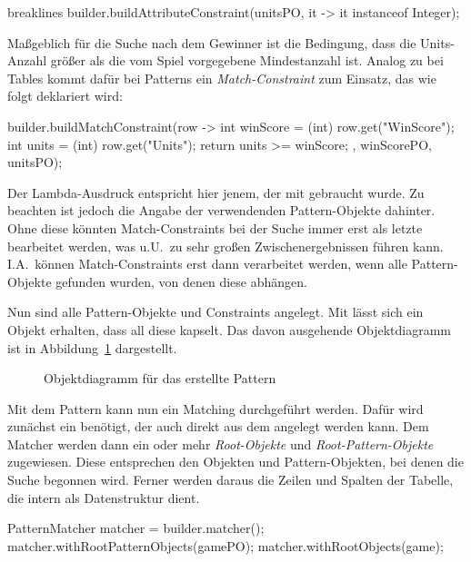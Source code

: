 \begin{jcodeblock*}{breaklines}
    builder.buildAttributeConstraint(unitsPO, it -> it instanceof Integer);
\end{jcodeblock*}

Maßgeblich für die Suche nach dem Gewinner ist die Bedingung, dass die Units-Anzahl größer als die vom Spiel vorgegebene Mindestanzahl ist.
Analog zu  bei Tables kommt dafür bei Patterns ein \emph{Match-Constraint} zum Einsatz,
das wie folgt deklariert wird:

\begin{jcodeblock}
    builder.buildMatchConstraint(row -> {
        int winScore = (int) row.get("WinScore");
        int units = (int) row.get("Units");
        return units >= winScore;
    }, winScorePO, unitsPO);
\end{jcodeblock}

Der Lambda-Ausdruck entspricht hier jenem, der mit  gebraucht wurde.
Zu beachten ist jedoch die Angabe der verwendenden Pattern-Objekte dahinter.
Ohne diese könnten Match-Constraints bei der Suche immer erst als letzte bearbeitet werden,
was u.U.\ zu sehr großen Zwischenergebnissen führen kann.
I.A.\ können Match-Constraints erst dann verarbeitet werden, wenn alle Pattern-Objekte gefunden wurden,
von denen diese abhängen.

Nun sind alle Pattern-Objekte und Constraints angelegt.
Mit  lässt sich ein Objekt erhalten, dass all diese kapselt.
Das davon ausgehende Objektdiagramm ist in Abbildung~\ref{fig:pattern-diagram} dargestellt.

\begin{figure}
    \caption{Objektdiagramm für das erstellte Pattern}
    \label{fig:pattern-diagram}
\end{figure}

Mit dem Pattern kann nun ein Matching durchgeführt werden.
Dafür wird zunächst ein  benötigt, der auch direkt aus dem  angelegt werden kann.
Dem Matcher werden dann ein oder mehr \emph{Root-Objekte} und \emph{Root-Pattern-Objekte} zugewiesen.
Diese entsprechen den Objekten und Pattern-Objekten, bei denen die Suche begonnen wird.
Ferner werden daraus die Zeilen und Spalten der Tabelle, die intern als Datenstruktur dient.

\begin{jcodeblock}
    PatternMatcher matcher = builder.matcher();
    matcher.withRootPatternObjects(gamePO);
    matcher.withRootObjects(game);
\end{jcodeblock}

